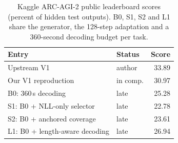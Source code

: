 \begin{table}[t]\centering\footnotesize
\caption{Kaggle ARC-AGI-2 public leaderboard scores (percent of hidden test outputs). B0, S1, S2 and L1 share the generator, the 128-step adaptation and a 360-second decoding budget per task.}\label{tab:leaderboard}
\setlength{\tabcolsep}{3pt}\begin{tabular}{llr}\toprule
Entry & Status & Score \\\midrule
Upstream V1 \citep{rudra2026} & author & 33.89 \\
Our V1 reproduction & in comp. & 30.97 \\
B0: 360\,s decoding & late & 25.28 \\
S1: B0 + NLL-only selector & late & 22.78 \\
S2: B0 + anchored coverage & late & 23.61 \\
L1: B0 + length-aware decoding & late & 26.94 \\
\bottomrule\end{tabular}\end{table}
